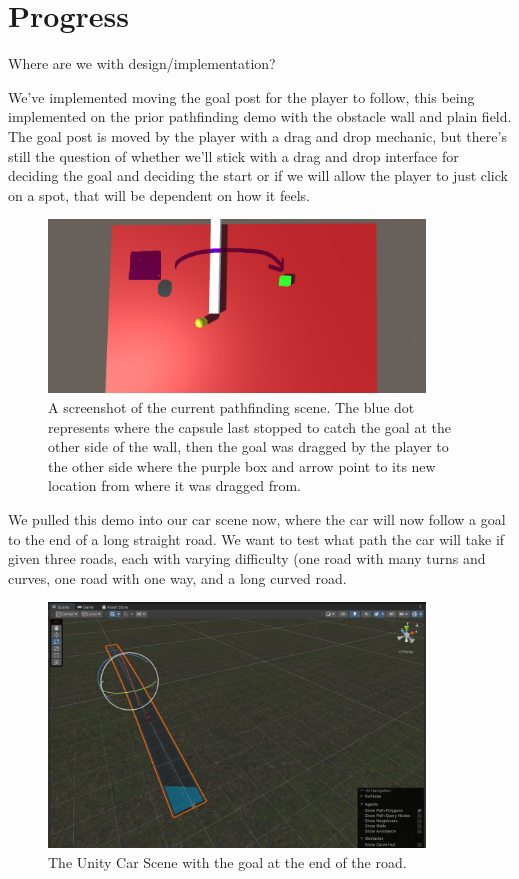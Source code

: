 \section{Progress}

Where are we with design/implementation?

We've implemented moving the goal post for the player to follow, this being implemented on the prior pathfinding demo with the obstacle wall and plain field. The goal post is moved by the player with a drag and drop mechanic, but there's still the question of whether we'll stick with a drag and drop interface for deciding the goal and deciding the start or if we will allow the player to just click on a spot, that will be dependent on how it feels. 


\begin{figure}[htb]
    \centering
    \includegraphics[width=10cm]{../Images/Update3/PathfindingDemo.png}
       \caption{A screenshot of the current pathfinding scene. The blue dot represents where the capsule last stopped to catch the goal at the other side of the wall, then the goal was dragged by the player to the other side where the purple box and arrow point to its new location from where it was dragged from.}
           \label{Fig:Pathfinding Demo 2.0}
  \end{figure}

\begin{flushleft}
We pulled this demo into our car scene now, where the car will now follow a goal to the end of a long straight road. We want to test what path the car will take if given three roads, each with varying difficulty (one road with many turns and curves, one road with one way, and a long curved road.
\end{flushleft}

\begin{figure}[!ht]
    \centering
    \includegraphics[width=10cm]{../Images/Update3/CarScene.png}
       \caption{The Unity Car Scene with the goal at the end of the road.}
           \label{Fig:UnityCarScene}
   \end{figure}

